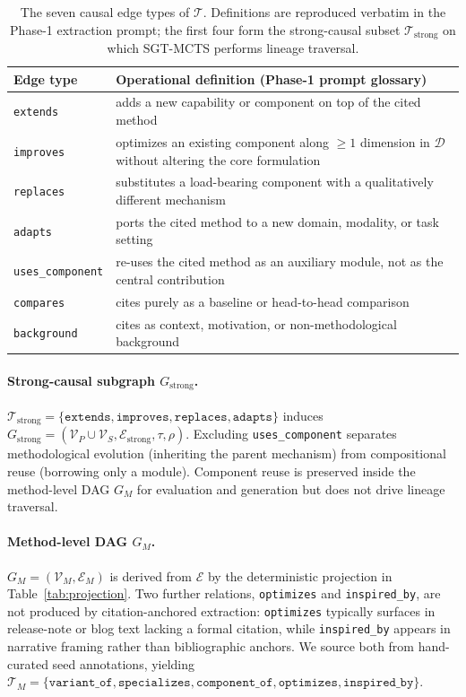 \documentclass{llmxive}
\begin{document}
\begin{table}[!htbp]
\centering
\begin{tabularx}{\linewidth}{l X}
\toprule
Edge type & Operational definition (Phase-1 prompt glossary) \\
\midrule
\texttt{extends} & adds a new capability or component on top of the cited method \\
\texttt{improves} & optimizes an existing component along $\ge 1$ dimension in $\mathcal{D}$ without altering the
core formulation \\
\texttt{replaces} & substitutes a load-bearing component with a qualitatively different mechanism \\
\texttt{adapts} & ports the cited method to a new domain, modality, or task setting \\
\texttt{uses\_component} & re-uses the cited method as an auxiliary module, not as the central contribution \\
\texttt{compares} & cites purely as a baseline or head-to-head comparison \\
\texttt{background} & cites as context, motivation, or non-methodological background \\
\bottomrule
\end{tabularx}
\caption{The seven causal edge types of $\mathcal{T}$. Definitions are reproduced verbatim in the Phase-1
extraction prompt; the first four form the strong-causal subset $\mathcal{T}_{\text{strong}}$ on which SGT-MCTS
performs lineage traversal.}
\label{tab:edge-types}
\end{table}

\paragraph{Strong-causal subgraph \texorpdfstring{$G_{\text{strong}}$}{Gstrong}.}
$\mathcal{T}_{\text{strong}}=\{\texttt{extends},\texttt{improves},\texttt{replaces},\texttt{adapts}\}$ induces $G_{\text{strong}}=(\mathcal{V}_P\cup\mathcal{V}_S,\mathcal{E}_{\text{strong}},\tau,
\rho)$. Excluding \texttt{uses\_component} separates methodological evolution (inheriting the parent mechanism) from compositional reuse (borrowing only a module). Component reuse is preserved inside the
method-level DAG $G_M$ for evaluation and generation but does not drive lineage traversal.

\paragraph{Method-level DAG \texorpdfstring{$G_M$}{GM}.}
$G_M=(\mathcal{V}_M,\mathcal{E}_M)$ is derived from $\mathcal{E}$ by the deterministic projection in
Table~\ref{tab:projection}. Two further relations, \texttt{optimizes} and \texttt{inspired\_by}, are not produced
by citation-anchored extraction: \texttt{optimizes} typically surfaces in release-note or blog text lacking a
formal citation, while \texttt{inspired\_by} appears in narrative framing rather than bibliographic anchors. We
source both from hand-curated seed annotations, yielding $\mathcal{T}_M=\{\texttt{variant\_of}, \texttt{specializes}, \texttt{component\_of},\texttt{optimizes},\texttt{inspired\_by}\}$.
\end{document}
